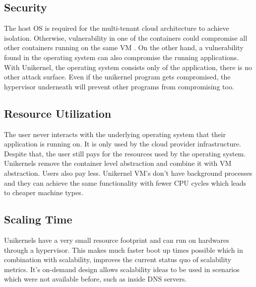\subsection{Security}
 The host OS is required for the multi-tenant cloud architecture to achieve isolation. Otherwise, vulnerability in one of the containers could compromise all other containers running on the same VM \cite{CVE-2018-9862-details}. On the other hand, a vulnerability found in the operating system can also compromise the running applications. With Unikernel, the operating system consists only of the application, there is no other attack surface. Even if the unikernel program gets compromised, the hypervisor underneath will prevent other programs from compromising too.

\subsection{Resource Utilization}
The user never interacts with the underlying operating system that their application is running on. It is only used by the cloud provider infrastructure. Despite that, the user still pays for the resources used by the operating system. Unikernels remove the container level abstraction and combine it with VM abstraction. Users also pay less. Unikernel VM's don't have background processes and they can achieve the same functionality with fewer CPU cycles which leads to cheaper machine types.

\subsection{Scaling Time}
Unikernels have a very small resource footprint and can run on hardwares through a hypervisor. This makes much faster boot up times possible which in combination with scalability, improves the current status quo of scalability metrics. It's on-demand design allows scalability ideas to be used in scenarios which were not available before, such as inside DNS servers.

